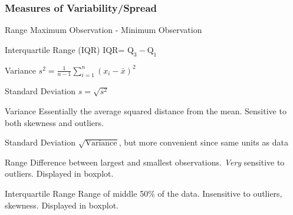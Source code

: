 \documentclass[handout]{beamer}
\begin{document}
\begin{frame}
\frametitle{Measures of Variability/Spread}

\begin{block}{Range}
Maximum Observation - Minimum Observation
\end{block}
\pause
\begin{block}{Interquartile Range (IQR)}
IQR= $\mbox{Q}_3 - \mbox{Q}_1$
\end{block}
\pause
\begin{block}{Variance}
$\displaystyle s^2 = \frac{1}{n-1} \sum_{i=1}^n (x_i - \bar{x})^2$
\end{block}
\pause
 \begin{block}{Standard Deviation}
	$s = \sqrt{s^2}$
\end{block}
\end{frame}

\begin{frame}
\begin{block}{Variance}
Essentially the average squared distance from the mean. Sensitive to both skewness and outliers.
\end{block}
\pause
\begin{block}{Standard Deviation}
$\sqrt{\mbox{Variance}}$, but more convenient since \alert{same units as data}
\end{block}
\pause
\begin{block}{Range}
Difference between largest and smallest observations. \emph{Very} sensitive to outliers. Displayed in boxplot.
\end{block}
\pause
\begin{block}{Interquartile Range}
Range of middle 50\% of the data. Insensitive to outliers, skewness. Displayed in boxplot.
\end{block}

\end{frame}



\end{document}
